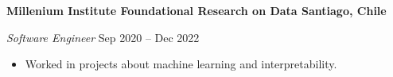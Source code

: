 \documentclass[../main.tex]{subfiles}
\begin{document}
    \textbf{Millenium Institute Foundational Research on Data \hfill  Santiago, Chile} \par
    \textit{Software Engineer} \hfill Sep 2020 -- Dec 2022 \par
    \begin{itemize}
        \item Worked in projects about machine learning and interpretability.
\end{itemize} \par
\end{document}
